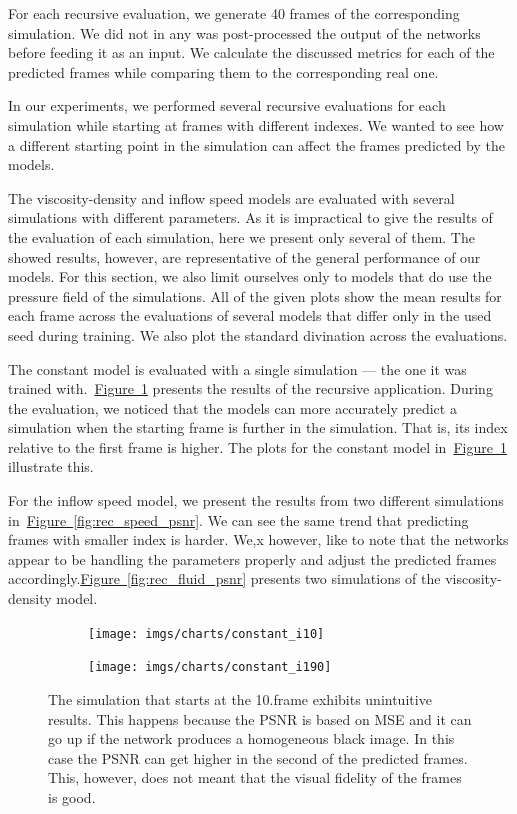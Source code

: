 \documentclass{llncs}
\newcommand{\reffig}[1]{\hyperref[#1]{Figure~\ref*{#1}}}
\begin{document}
For each recursive evaluation, we generate 40 frames of the corresponding simulation. We did not in any was post-processed the output of the networks before feeding it as an input. We calculate the discussed metrics for each of the predicted frames while comparing them to the corresponding real one.

In our experiments, we performed several recursive evaluations for each simulation while starting at frames with different indexes. We wanted to see how a different starting point in the simulation can affect the frames predicted by the models.

The viscosity-density and inflow speed models are evaluated with several simulations with different parameters. As it is impractical to give the results of the evaluation of each simulation, here we present only several of them. The showed results, however, are representative of the general performance of our models. For this section, we also limit ourselves only to models that do use the pressure field of the simulations. All of the given plots show the mean results for each frame across the evaluations of several models that differ only in the used seed during training. We also plot the standard divination across the evaluations.

The constant model is evaluated with a single simulation --- the one it was trained with.~\reffig{fig:rec_const_psnr} presents the results of the recursive application. During the evaluation, we noticed that the models can more accurately predict a simulation when the starting frame is further in the simulation. That is, its index relative to the first frame is higher. The plots for the constant model in~\reffig{fig:rec_const_psnr} illustrate this.

For the inflow speed model, we present the results from two different simulations in~\reffig{fig:rec_speed_psnr}. We can see the same trend that predicting frames with smaller index is harder. We,x however, like to note that the networks appear to be handling the parameters properly and adjust the predicted frames accordingly.\reffig{fig:rec_fluid_psnr} presents two simulations of the viscosity-density model.

\begin{figure}
  \begin{subfigure}{.5\textwidth}
    \centering
    \texttt{[image: imgs/charts/constant\_i10]}
  \end{subfigure}
  \begin{subfigure}{.5\textwidth}
    \centering
    \texttt{[image: imgs/charts/constant\_i190]}
  \end{subfigure}  
  \caption{The simulation that starts at the 10.\@ frame exhibits unintuitive results. This happens because the PSNR is based on MSE and it can go up if the network produces a homogeneous black image. In this case the PSNR can get higher in the second of the predicted frames. This, however, does not meant that the visual fidelity of the frames is good.}\label{fig:rec_const_psnr}
\end{figure}
\end{document}
